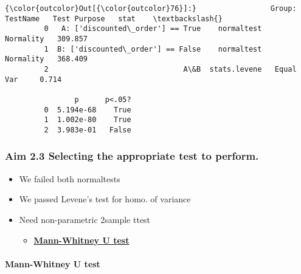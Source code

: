 \documentclass[11pt]{article}
\providecommand{\tightlist}{%
      \setlength{\itemsep}{0pt}\setlength{\parskip}{0pt}}
\begin{document}
\begin{Verbatim}[commandchars=\\\{\}]
{\color{outcolor}Out[{\color{outcolor}76}]:}                 Group:                 TestName   Test Purpose   stat    \textbackslash{}
         0   A: ['discounted\_order'] == True    normaltest   Normality   309.857   
         1  B: ['discounted\_order'] == False    normaltest   Normality   368.409   
         2                               A\&B  stats.levene   Equal Var     0.714   
         
                p      p<.05?  
         0  5.194e-68    True  
         1  1.002e-80    True  
         2  3.983e-01   False  
\end{Verbatim}
            
    \hypertarget{aim-2.3-selecting-the-appropriate-test-to-perform.}{%
\subsubsection{Aim 2.3 Selecting the appropriate test to
perform.}\label{aim-2.3-selecting-the-appropriate-test-to-perform.}}

\begin{itemize}
\tightlist
\item
  We failed both normaltests
\item
  We passed Levene's test for homo. of variance
\item
  Need non-parametric 2sample ttest

  \begin{itemize}
  \tightlist
  \item
    \href{https://docs.scipy.org/doc/scipy/reference/generated/scipy.stats.mannwhitneyu.html}{\textbf{Mann-Whitney
    U test}}
  \end{itemize}
\end{itemize}

    \hypertarget{mann-whitney-u-test}{%
\paragraph{Mann-Whitney U test}\label{mann-whitney-u-test}}
\end{document}
